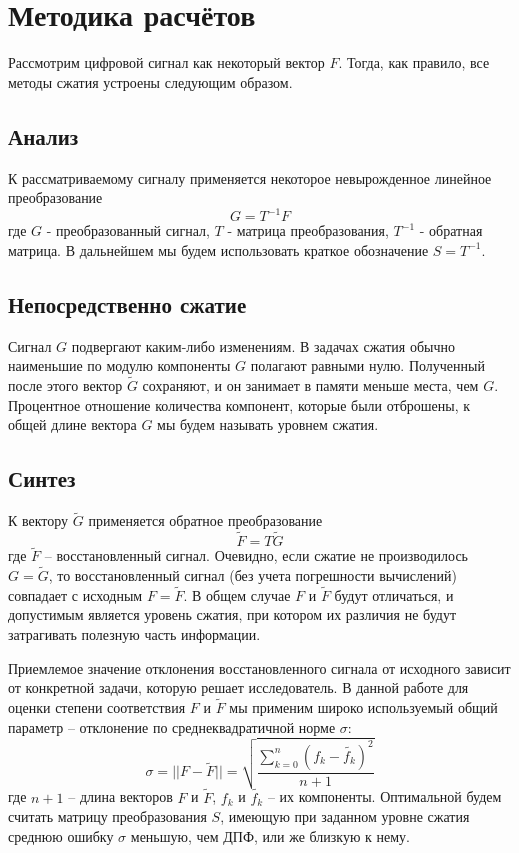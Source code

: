 \documentclass[11pt, oneside, a4paper]{article}
\begin{document}
\section{Методика расчётов}

Рассмотрим цифровой сигнал как некоторый вектор $F$. Тогда, как правило, все методы сжатия устроены следующим образом.

\subsection{Анализ} 

К рассматриваемому сигналу применяется некоторое невырожденное линейное преобразование
\begin{equation}
\label{directConverstion}
    G = T^{-1} F
\end{equation}
где $G$ - преобразованный сигнал, $T$ - матрица преобразования, $T^{-1}$ - обратная матрица. В дальнейшем мы будем использовать краткое обозначение $S = T^{-1}$.

\subsection{Непосредственно сжатие} 

Сигнал $G$ подвергают каким-либо изменениям. В задачах сжатия обычно наименьшие по модулю компоненты $G$ полагают равными нулю. Полученный после этого вектор $\tilde{G}$ сохраняют, и он занимает в памяти меньше места, чем $G$. Процентное отношение количества компонент, которые были отброшены, к общей длине вектора $G$ мы будем называть уровнем сжатия.

\subsection{Синтез} 

К вектору $\tilde{G}$ применяется обратное преобразование 
\begin{equation}
\label{inverseConverstion}
    \tilde{F} = T\tilde{G}
\end{equation}
где $\tilde{F}$ – восстановленный сигнал. Очевидно, если сжатие не производилось $G=\tilde{G}$, то восстановленный сигнал (без учета погрешности вычислений) совпадает с исходным $F=\tilde{F}$. В общем случае $F$ и $\tilde{F}$ будут отличаться, и допустимым является уровень сжатия, при котором их различия не будут затрагивать полезную часть информации.

Приемлемое значение отклонения восстановленного сигнала от исходного зависит от конкретной задачи, которую решает исследователь. В данной работе для оценки степени соответствия $F$ и $\tilde{F}$ мы применим широко используемый общий параметр – отклонение по среднеквадратичной норме $\sigma$:
\begin{equation}
\label{squareNorm}
    \sigma = ||F-\tilde{F}||=\sqrt{\frac{\sum\limits_{k=0}^{n}(f_k-\tilde{f_k})^2}{n+1}}
\end{equation}
где $n+1$ – длина векторов $F$ и $\tilde{F}$, $f_k$ и $\tilde{f_k}$ – их компоненты. Оптимальной будем считать матрицу преобразования $S$, имеющую при заданном уровне сжатия среднюю ошибку $\sigma$ меньшую, чем ДПФ, или же близкую к нему.
\end{document}
